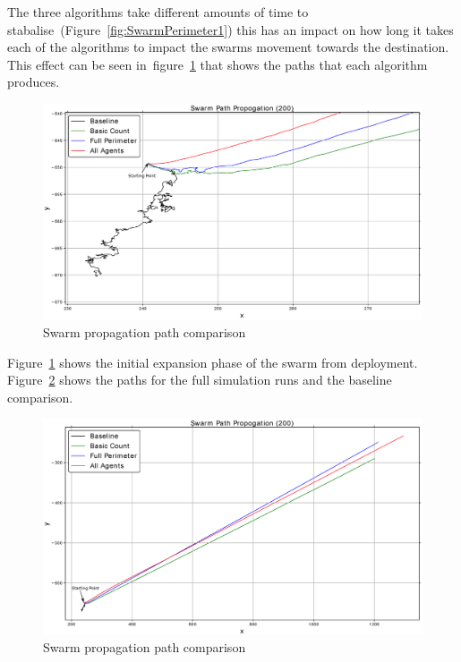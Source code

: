 The three algorithms take different amounts of time to stabalise~(Figure~\ref{fig:SwarmPerimeter1}) this has an impact on how long it takes each of the algorithms to impact the swarms movement towards the destination. This effect can be seen in~figure~\ref{reduced:SwarmPropagationPathComparison1} that shows the paths that each algorithm produces. 

\begin{figure}[H]
\begin{center}
\includegraphics[width=14cm]{CHAPTER-6/figures/SwarmPropagationComparison1}
\end{center}
\caption{Swarm propagation path comparison\label{reduced:SwarmPropagationPathComparison1}}
\end{figure}

Figure~\ref{reduced:SwarmPropagationPathComparison1} shows the initial expansion phase of the swarm from deployment. Figure~\ref{reduced:SwarmPropagationPathComparison2} shows the paths for the full simulation runs and the baseline comparison.

\begin{figure}[H]
\begin{center}
\includegraphics[width=14cm]{CHAPTER-6/figures/SwarmPropagationComparison2}
\end{center}
\caption{Swarm propagation path comparison\label{reduced:SwarmPropagationPathComparison2}}
\end{figure}

